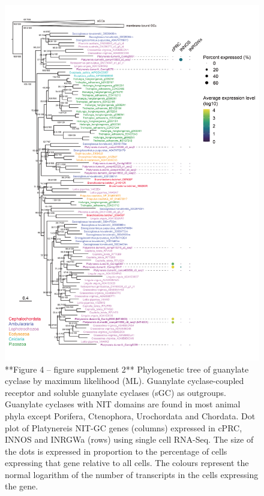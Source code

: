 \documentclass[
  10pt,
  onecolumn]{article}
\begin{document}
\begin{figure}
\includegraphics[width=20.83in]{figures/Fig4_sup2} \caption{**Figure 4 -- figure supplement 2** Phylogenetic tree of guanylate cyclase by maximum likelihood (ML). Guanylate cyclase-coupled receptor and soluble guanylate cyclases (sGC) as outgroups. Guanylate cyclases with NIT domains are found in most animal phyla except Porifera, Ctenophora, Urochordata and Chordata. Dot plot of Platynereis NIT-GC genes (columns) expressed in cPRC, INNOS and INRGWa (rows) using single cell RNA-Seq. The size of the dots is expressed in proportion to the percentage of cells expressing that gene relative to all cells. The colours represent the normal logarithm of the number of transcripts in the cells expressing the gene.}\label{fig:unnamed-chunk-13}
\end{figure}
\end{document}
